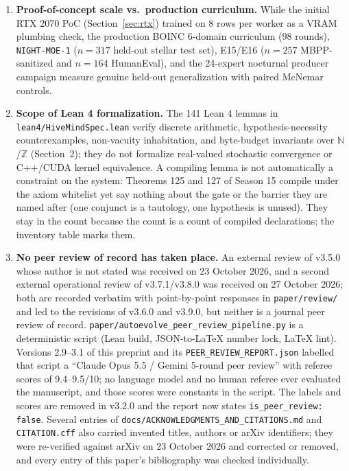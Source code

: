 \documentclass[11pt,a4paper]{article}
\begin{document}
\begin{enumerate}[leftmargin=1.8em]
    \item \textbf{Proof-of-concept scale vs.\ production curriculum.} While the initial RTX 2070 PoC (Section~\ref{sec:rtx}) trained on 8 rows per worker as a VRAM plumbing check, the production BOINC 6-domain curriculum ($98$ rounds), \texttt{NIGHT-MOE-1} ($n=317$ held-out stellar test set), E15/E16 ($n=257$ MBPP-sanitized and $n=164$ HumanEval), and the 24-expert nocturnal producer campaign measure genuine held-out generalization with paired McNemar controls.
    \item \textbf{Scope of Lean 4 formalization.} The 141 Lean 4 lemmas in \texttt{lean4/HiveMindSpec.lean} verify discrete arithmetic, hypothesis-necessity counterexamples, non-vacuity inhabitation, and byte-budget invariants over $\mathbb{N}$/$\mathbb{Z}$ (Section~2); they do not formalize real-valued stochastic convergence or C++/CUDA kernel equivalence. A compiling lemma is not automatically a constraint on the system: Theorems 125 and 127 of Season 15 compile under the axiom whitelist yet say nothing about the gate or the barrier they are named after (one conjunct is a tautology, one hypothesis is unused). They stay in the count because the count is a count of compiled declarations; the inventory table marks them.
    \item \textbf{No peer review of record has taken place.} An external review of v3.5.0 whose author is not stated was received on 23 October 2026, and a second external operational review of v3.7.1/v3.8.0 was received on 27 October 2026; both are recorded verbatim with point-by-point responses in \texttt{paper/review/} and led to the revisions of v3.6.0 and v3.9.0, but neither is a journal peer review of record. \texttt{paper/autoevolve\_peer\_review\_pipeline.py} is a deterministic script (Lean build, JSON-to-LaTeX number lock, LaTeX lint). Versions 2.9--3.1 of this preprint and its \texttt{PEER\_REVIEW\_REPORT.json} labelled that script a ``Claude Opus 5.5 / Gemini 5-round peer review'' with referee scores of 9.4--9.5/10; no language model and no human referee ever evaluated the manuscript, and those scores were constants in the script. The labels and scores are removed in v3.2.0 and the report now states \texttt{is\_peer\_review: false}. Several entries of \texttt{docs/ACKNOWLEDGMENTS\_AND\_CITATIONS.md} and \texttt{CITATION.cff} also carried invented titles, authors or arXiv identifiers; they were re-verified against arXiv on 23 October 2026 and corrected or removed, and every entry of this paper's bibliography was checked individually.
\end{enumerate}
\end{document}
